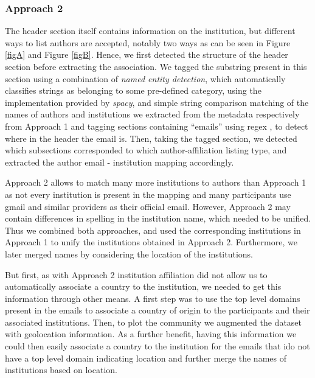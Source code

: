 \documentclass[article,twocolumn]{IEEEtran}
\begin{document}
    \hypertarget{approach-2}{%
\subsubsection{Approach 2}\label{approach-2}}

The header section itself contains information on the institution, but
different ways to list authors are accepted, notably two ways as can be
seen in Figure \ref{figA} and Figure \ref{figB}. Hence, we first
detected the structure of the header section before extracting the
association. We tagged the substring present in this section using a
combination of \emph{named entity detection}, which automatically
classifies strings as belonging to some pre-defined category, using the
implementation provided by \emph{spacy}\cite{spacy2}, and simple string
comparison matching of the names of authors and institutions we
extracted from the metadata respectively from Approach 1 and tagging
sections containing ``emails'' using regex , to detect where in the
header the email is. Then, taking the tagged section, we detected which
subsections corresponded to which author-affiliation listing type, and
extracted the author email - institution mapping accordingly.

Approach 2 allows to match many more institutions to authors than
Approach 1 as not every institution is present in the mapping and many
participants use gmail and similar providers as their official email.
However, Approach 2 may contain differences in spelling in the
institution name, which needed to be unified. Thus we combined both
approaches, and used the corresponding institutions in Approach 1 to
unify the institutions obtained in Approach 2. Furthermore, we later
merged names by considering the location of the institutions.

But first, as with Approach 2 institution affiliation did not allow us
to automatically associate a country to the institution, we needed to
get this information through other means. A first step was to use the
top level domains present in the emails to associate a country of origin
to the participants and their associated institutions. Then, to plot the
community we augmented the dataset with geolocation information. As a
further benefit, having this information we could then easily associate
a country to the institution for the emails that ido not have a top
level domain indicating location and further merge the names of
institutions based on location.
\end{document}

